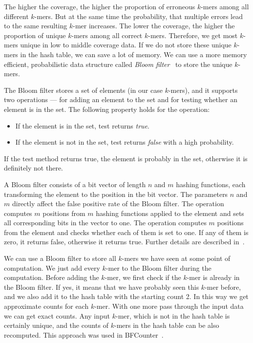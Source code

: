 The higher the coverage, the higher the proportion of erroneous $k$-mers among all different $k$-mers. But at the same time the probability, that multiple errors lead to the same resulting $k$-mer increases. The lower the coverage, the higher the proportion of unique $k$-mers among all correct $k$-mers. Therefore, we get most $k$-mers unique in low to middle coverage data.
If we do not store these unique $k$-mers in the hash table, we can save a lot of memory. We can use a more memory efficient, probabilistic data structure called \emph{Bloom filter}~\cite{bloomfilter} to store the unique $k$-mers.

The Bloom filter stores a set of elements (in our case $k$-mers), and it supports two operations ---  for adding an element to the set and  for testing whether an element is in the set. The following property holds for the  operation:
\begin{itemize}
  \item If the element is in the set, test returns \emph{true}.
  \item If the element is not in the set, test returns \emph{false} with a high probability.
\end{itemize}
If the test method returns true, the element is probably in the set, otherwise it is definitely not there.

A Bloom filter consists of a bit vector of length $n$ and $m$ hashing functions, each transforming the element to the position in the bit vector. The parameters $n$ and $m$ directly affect the false positive rate of the Bloom filter.
The  operation computes $m$ positions from $m$ hashing functions applied to the element and sets all corresponding bits in the vector to one.
The  operation computes $m$ positions from the element and checks whether each of them is set to one. If any of them is zero, it returns false, otherwise it returns true. Further details are described in~\cite{bloomfilter}.

We can use a Bloom filter to store all $k$-mers we have seen at some point of computation. We just add every $k$-mer to the Bloom filter during the computation. Before adding the $k$-mer, we first check if the $k$-mer is already in the Bloom filter. If yes, it means that we have probably seen this $k$-mer before, and we also add it to the hash table with the starting count 2. In this way we get approximate counts for each $k$-mer.
With one more pass through the input data we can get exact counts.
Any input $k$-mer, which is not in the hash table is certainly unique, and the counts of $k$-mers in the hash table can be also recomputed. This approach was used in BFCounter~\cite{bfcounter}.

